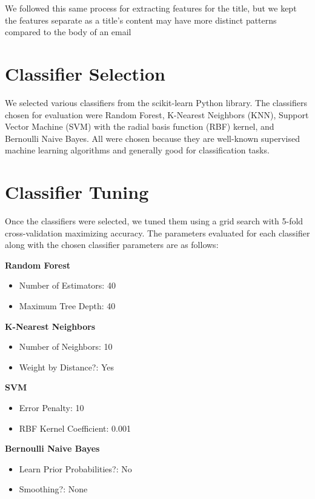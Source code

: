 \documentclass[12pt]{article}
\begin{document}
\begin{multicols}{2}
             
             We followed this same process for extracting features for the title, but
             we kept the features separate as a title's content may have more distinct
             patterns compared to the body of an email
        
        \section{Classifier Selection}
        
            We selected various classifiers from the scikit-learn Python library. The 
            classifiers chosen for evaluation were Random Forest, K-Nearest Neighbors (KNN), 
            Support Vector Machine (SVM) with the radial basis function (RBF) kernel, and Bernoulli 
            Naive Bayes. All were chosen because they are well-known supervised machine learning 
            algorithms and generally good for classification tasks. 
        
        \section{Classifier Tuning}
            Once the classifiers were selected, we tuned them using a grid search with 5-fold 
            cross-validation maximizing accuracy. The parameters evaluated for each classifier along 
            with the chosen classifier parameters are as follows:
            
            \noindent\textbf{Random Forest}
            \begin{itemize}
                \setlength\itemsep{0em}
                \item Number of Estimators: 40
                \item Maximum Tree Depth: 40
            \end{itemize}
            \textbf{K-Nearest Neighbors}
            \begin{itemize}
                \setlength\itemsep{0em}
                \item Number of Neighbors: 10
                \item Weight by Distance?: Yes
            \end{itemize}
            \textbf{SVM}
            \begin{itemize}
                \setlength\itemsep{0em}
                \item Error Penalty: 10
                \item RBF Kernel Coefficient: 0.001
            \end{itemize}
            \textbf{Bernoulli Naive Bayes}
            \begin{itemize}
                \setlength\itemsep{0em}
                \item Learn Prior Probabilities?: No
                \item Smoothing?: None
            \end{itemize}


\end{multicols}
\end{document}
